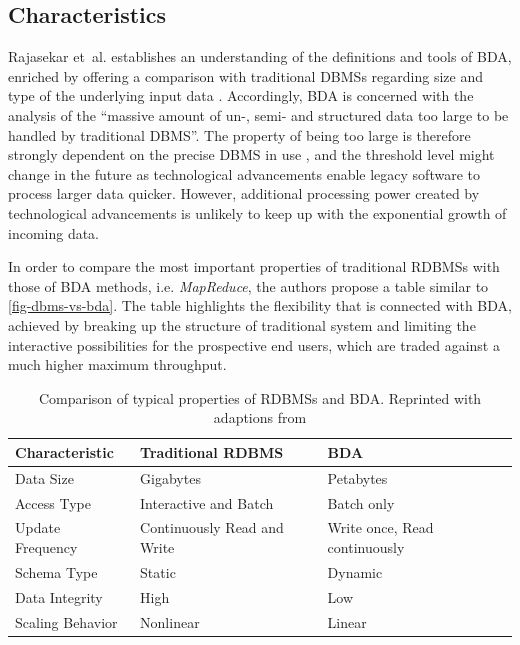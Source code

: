 \subsection{Characteristics}
\label{sota-bda-characteristics}

Rajasekar et~al. establishes an understanding of the definitions and tools of \ac{BDA}, enriched by offering a comparison with traditional \acp{DBMS} regarding size and type of the underlying input data \autocite[p.~80]{rajasekar2015survey}. Accordingly, \ac{BDA} is concerned with the analysis of the \enquote{massive amount of un-, semi- and structured data too large to be handled by traditional DBMS}. The property of being too large is therefore strongly dependent on the precise \ac{DBMS} in use \autocite[p.~80]{rajasekar2015survey}, and the threshold level might change in the future as technological advancements enable legacy software to process larger data quicker. However, additional processing power created by technological advancements is unlikely to keep up with the exponential growth of incoming data. \autocite[p.~80\psq]{rajasekar2015survey}

In order to compare the most important properties of traditional \acp{RDBMS} with those of \ac{BDA} methods, i.e. \emph{MapReduce}, the authors propose a table similar to \autoref{fig-dbms-vs-bda}. The table highlights the flexibility that is connected with \ac{BDA}, achieved by breaking up the structure of traditional system and limiting the interactive possibilities for the prospective end users, which are traded against a much higher maximum throughput. \autocite[p.~80]{rajasekar2015survey}

\begin{table}[hbt]
	\begin{tabular}{lll}
	  Characteristic & Traditional \ac{RDBMS} & \acl{BDA} \\
	  \hline
	  Data Size & Gigabytes & Petabytes \\
	  Access Type & Interactive and Batch & Batch only \\
	  Update Frequency & Continuously Read and Write & Write once, Read continuously \\
	  Schema Type & Static & Dynamic \\
	  Data Integrity & High & Low \\
	  Scaling Behavior & Nonlinear & Linear \\
	\end{tabular}
	\caption{Comparison of typical properties of \acl{RDBMS}s and \acl{BDA}. Reprinted with adaptions from \textcite[p.~80]{rajasekar2015survey}}
	\label{fig-dbms-vs-bda}
\end{table}

